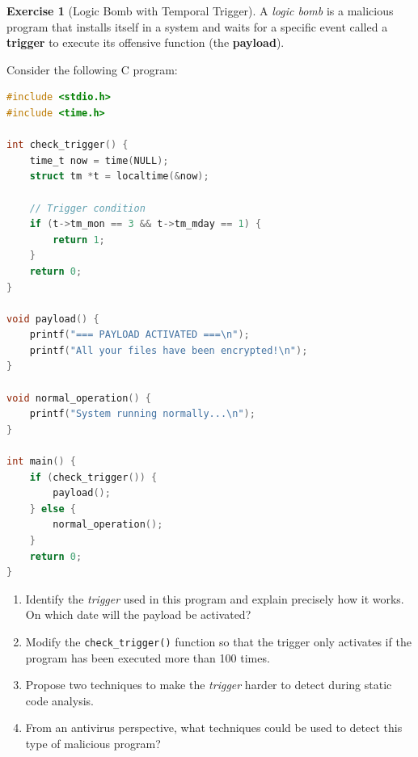\documentclass[a4paper,11pt]{article}
\theoremstyle{plain}
\theoremstyle{definition}
\newtheorem{exercice}{Exercise}
\begin{document}
\begin{exercice}[Logic Bomb with Temporal Trigger]

A \textit{logic bomb} is a malicious program that installs itself in a system and waits for a specific event called a \textbf{trigger} to execute its offensive function (the \textbf{payload}).

Consider the following C program:

\begin{lstlisting}[language=C]
#include <stdio.h>
#include <time.h>

int check_trigger() {
    time_t now = time(NULL);
    struct tm *t = localtime(&now);

    // Trigger condition
    if (t->tm_mon == 3 && t->tm_mday == 1) {
        return 1;
    }
    return 0;
}

void payload() {
    printf("=== PAYLOAD ACTIVATED ===\n");
    printf("All your files have been encrypted!\n");
}

void normal_operation() {
    printf("System running normally...\n");
}

int main() {
    if (check_trigger()) {
        payload();
    } else {
        normal_operation();
    }
    return 0;
}
\end{lstlisting}

\begin{enumerate}
\item Identify the \textit{trigger} used in this program and explain precisely how it works. On which date will the payload be activated?

\item Modify the \texttt{check\_trigger()} function so that the trigger only activates if the program has been executed more than 100 times.

\item Propose two techniques to make the \textit{trigger} harder to detect during static code analysis.

\item From an antivirus perspective, what techniques could be used to detect this type of malicious program?
\end{enumerate}

\end{exercice}
\end{document}

